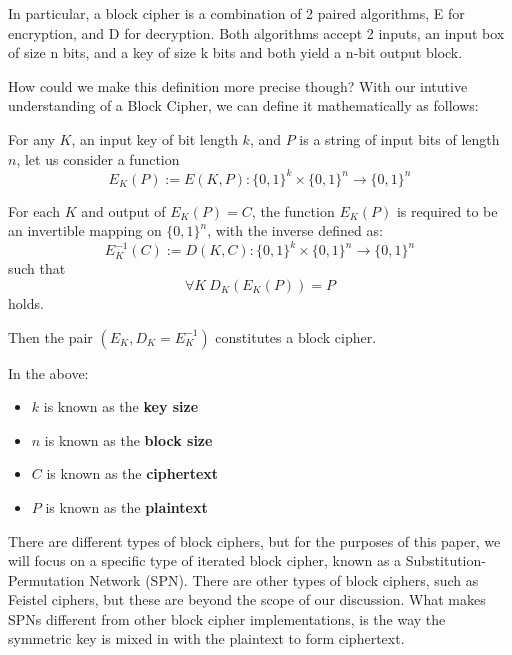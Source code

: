 In particular, a block cipher is a combination of 2 paired algorithms, E for
encryption, and D for decryption. Both algorithms accept 2 inputs, an input box
of size n bits, and a key of size k bits and both yield a n-bit output block. 

How could we make this definition more precise though? With our intutive
understanding of a Block Cipher, we can define it mathematically as follows:

\begin{defn} \cite[]{handbook}
For any $K$, an input key of bit length $k$, and $P$ is a string of input bits
of length $n$, let us consider a function 
\begin{equation} \label{block-encrypt}
E_K(P) := E(K,P): \{0,1\}^k \times \{0,1\}^n \rightarrow \{0,1\}^n
\end{equation}

For each $K$ and output of $E_K(P) = C$, the function $E_K(P)$ is required to be an invertible mapping
on $\{0,1\}^n$, with the inverse defined as:
\begin{equation}\label{block-decrypt}
E_K ^{-1}(C) := D(K,C): \{0,1\}^k \times \{0,1\}^n \rightarrow \{0,1\}^n
\end{equation}
such that
\begin{equation}
\forall K\ D_K(E_K(P)) = P
\end{equation}
holds.

Then the pair $(E_K, D_K = E_K ^{-1})$ constitutes a block cipher. 
\end{defn}

\begin{rem}
In the above:
\begin{itemize}
\item $k$ is known as the \textbf{key size}
\item $n$ is known as the \textbf{block size}
\item $C$ is known as the \textbf{ciphertext}
\item $P$ is known as the \textbf{plaintext}
\end{itemize}
\end{rem}

There are different types of block ciphers, but for the purposes of this paper,
we will focus on a specific type of iterated block cipher, known as a
Substitution-Permutation Network (SPN). There are other types of block ciphers,
such as Feistel ciphers, but these are beyond the scope of our discussion.
What makes SPNs different from other block cipher implementations, is the way 
the symmetric key is mixed in with the plaintext to form ciphertext. 

